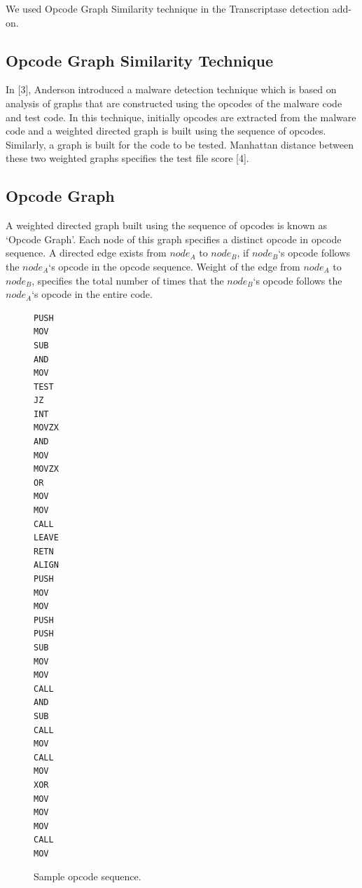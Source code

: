 We used Opcode Graph Similarity technique in the Transcriptase detection add-on.

\subsection{Opcode Graph Similarity Technique}

In [3], Anderson introduced a malware detection technique which is based on analysis of graphs that are constructed using the opcodes of the malware code and test code. In this technique, initially opcodes are extracted from the malware code and a weighted directed graph is built using the sequence of opcodes. Similarly, a graph is built for the code to be tested. Manhattan distance between these two weighted graphs specifies the test file score [4].

\subsection{Opcode Graph}

A weighted directed graph built using the sequence of opcodes is known as `Opcode Graph'. Each node of this graph specifies a distinct opcode in opcode sequence. A directed edge exists from $node_A$ to $node_B$, if $node_B$`s opcode follows the $node_A$`s opcode in the opcode sequence. Weight of the edge from $node_A$ to $node_B$, specifies the total number of times that the $node_B$`s opcode follows the $node_A$`s opcode in the entire code. 

\begin{figure}[h]
  \centering
\begin{lstlisting}[frame=none,language=myasm,multicols=2] 
PUSH
MOV
SUB
AND
MOV
TEST
JZ
INT
MOVZX
AND
MOV
MOVZX
OR
MOV
MOV
CALL
LEAVE
RETN
ALIGN
PUSH
MOV
MOV
PUSH
PUSH
SUB
MOV
MOV
CALL
AND
SUB
CALL
MOV
CALL
MOV
XOR
MOV
MOV
MOV
CALL
MOV
\end{lstlisting}
    \caption[Sample opcode sequence]{Sample opcode sequence.}
    \label{fig:opcodesequence}
\end{figure}

